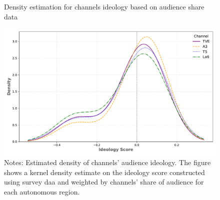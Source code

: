 \documentclass[12pt]{article}
\begin{document}

	
	
	\begin{figure}[H]
		\centering
		\caption{Density estimation for channels ideology based on audience share data}
		\includegraphics[width=120mm]{figures/channel_ideology_density_python}
		\caption*{\small Notes: Estimated density of channels' audience ideology. The figure shows a kernel density estimate on the ideology score constructed using survey daa and weighted by channels' share of audience for each autonomous region. }
		\label{fig:density}
	\end{figure}
	
	
	
	
	
\end{document}
